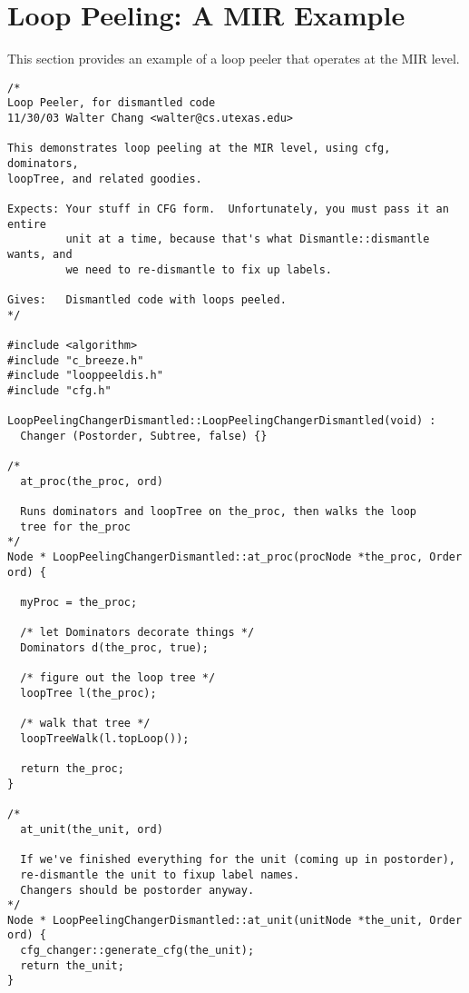 \documentclass[10pt]{article}
\begin{document}

\section{Loop Peeling: A MIR Example}

This section provides an example of a loop peeler that operates at the MIR
level.

\begin{small}
\begin{verbatim}
/*
Loop Peeler, for dismantled code
11/30/03 Walter Chang <walter@cs.utexas.edu>

This demonstrates loop peeling at the MIR level, using cfg, dominators,
loopTree, and related goodies.

Expects: Your stuff in CFG form.  Unfortunately, you must pass it an entire
         unit at a time, because that's what Dismantle::dismantle wants, and
         we need to re-dismantle to fix up labels.

Gives:   Dismantled code with loops peeled.
*/

#include <algorithm>
#include "c_breeze.h"
#include "looppeeldis.h"
#include "cfg.h"

LoopPeelingChangerDismantled::LoopPeelingChangerDismantled(void) : 
  Changer (Postorder, Subtree, false) {}

/*
  at_proc(the_proc, ord)
  
  Runs dominators and loopTree on the_proc, then walks the loop
  tree for the_proc
*/
Node * LoopPeelingChangerDismantled::at_proc(procNode *the_proc, Order ord) {

  myProc = the_proc;
  
  /* let Dominators decorate things */
  Dominators d(the_proc, true);
  
  /* figure out the loop tree */
  loopTree l(the_proc);
    
  /* walk that tree */
  loopTreeWalk(l.topLoop());

  return the_proc;
}

/*
  at_unit(the_unit, ord)

  If we've finished everything for the unit (coming up in postorder),
  re-dismantle the unit to fixup label names.
  Changers should be postorder anyway.
*/
Node * LoopPeelingChangerDismantled::at_unit(unitNode *the_unit, Order ord) {
  cfg_changer::generate_cfg(the_unit);
  return the_unit;
}


\end{verbatim}
\end{small}
\end{document}
